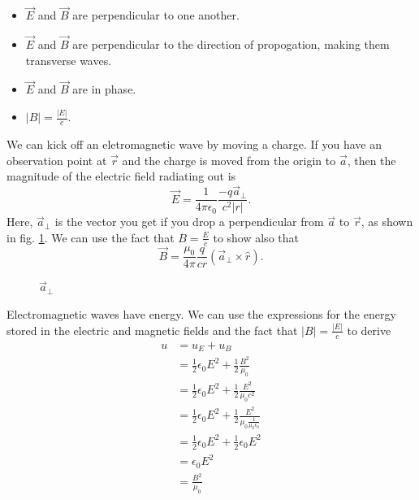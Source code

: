 \documentclass[nobib]{tufte-handout}
\begin{document}
\begin{itemize}
    \item $\vec{E}$ and $\vec{B}$ are perpendicular to one another. 
    \item $\vec{E}$ and $\vec{B}$ are perpendicular to the direction of propogation, making them transverse waves. 
    \item $\vec{E}$ and $\vec{B}$ are in phase.
    \item $|B| = \frac{|E|}{c}$.  
\end{itemize}
We can kick off an eletromagnetic wave by moving a charge. 
If you have an observation point at $\vec{r}$ and the charge is 
moved from the origin to $\vec{a}$, then the magnitude of the 
electric field radiating out is 
\[\vec{E} = \frac{1}{4\pi \epsilon_0} \frac{-q \vec{a}_{\perp}}{c^2|r|}.\]
Here, $\vec{a}_{\perp}$ is the vector you get if you drop 
a perpendicular from $\vec{a}$ to $\vec{r}$, as shown in fig. \ref{fig:aperp}. 
We can use the fact that $B = \frac{E}{c}$ to show also that 
\[\vec{B} = \frac{\mu_0}{4\pi} \frac{q}{cr}(\vec{a}_{\perp} \times \hat{r}).\]
\begin{figure}
    \caption{$\vec{a}_{\perp}$}
    \label{fig:aperp}
    \begin{center}
    \end{center}
\end{figure}

Electromagnetic waves have energy. We can use 
the expressions for the energy stored in 
the electric and magnetic fields and the fact 
that $|B| = \frac{|E|}{c}$ to derive 
\begin{align*}
    u &= u_E + u_B \\
    &= \frac{1}{2} \epsilon_0 E^2 + \frac{1}{2}\frac{B^2}{\mu_0} \\
    &= \frac{1}{2} \epsilon_0 E^2 + \frac{1}{2} \frac{E^2}{\mu_0 c^2} \\
    &= \frac{1}{2} \epsilon_0 E^2 + \frac{1}{2}\frac{E^2}{\mu_0 \frac{1}{\mu_0 \epsilon_0}} \\
    &= \frac{1}{2} \epsilon_0 E^2 + \frac{1}{2} \epsilon_0 E^2 \\
    &= \epsilon_0 E^2 \\
    &= \frac{B^2}{\mu_0}
\end{align*}
\end{document}
